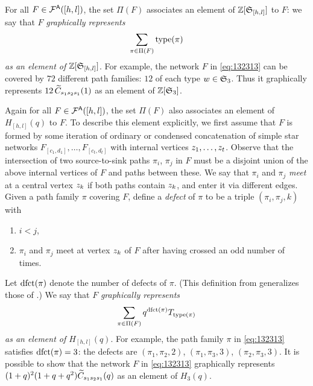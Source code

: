 \documentclass[11pt]{article}
\theoremstyle{definition}
\numberwithin{equation}{section}
\begin{document}
For all $F \in \mathcal F^{\mathsf{A}}([h,l])$, the set $\Pi(F)$ associates an element of
$\mathbb Z[\mathfrak{S}_{[h,l]}]$ to $F$:
we say that $F$ {\em graphically represents}
\begin{equation}\label{eq:Gtozsn}
\sum_{\pi \in \Pi(F)} \type(\pi)
\end{equation}
{\em as an element of $\mathbb Z[\mathfrak{S}_{[h,l]}]$}.
For example, the network $F$ in \eqref{eq:132313} can be covered by
$72$ different path families: $12$ of each type $w \in \mathfrak{S}_{3}$.
Thus it graphically represents
$12\,\widetilde{C}_{s_1s_2s_1}(1)$
as an element of $\mathbb Z [\mathfrak{S}_{3}]$.

Again for all $F \in \mathcal F^{\mathsf{A}}([h,l])$,
the set $\Pi(F)$ also associates an element of
$H_{[h,l]}(q)$ to $F$.
To describe this element explicitly, we first assume
that $F$ is formed by some iteration of ordinary or condensed concatenation
of simple star networks $F_{[c_1,d_1]}, \dotsc, F_{[c_t,d_t]}$ with
internal vertices $z_1, \dotsc, z_t$. Observe that
the intersection of two source-to-sink paths $\pi_i$, $\pi_j$ in $F$
must be a disjoint union of the above internal vertices of $F$
and paths between these.
We say that $\pi_i$ and $\pi_j$ {\em meet} at a central vertex $z_k$
if both paths contain $z_k$, and enter it via different edges.
Given a path family $\pi$ covering $F$,
define a {\em defect} of $\pi$ to be a triple $(\pi_i, \pi_j, k)$ with
\begin{enumerate}
  \item $i < j$,
  \item $\pi_i$ and $\pi_j$ meet at vertex $z_k$ of
    $F$ after having crossed an odd number of times.
\end{enumerate}
Let $\mathrm{dfct}(\pi)$ denote the number of defects of $\pi$.
(This definition from \cite{CSkanTNNChar}
generalizes those of \cite{BWHex, Deodhar90}.)
We say that $F$ {\em graphically represents}
\begin{equation}\label{eq:Gtozhnq}
\sum_{\pi \in \Pi(F)} q^{\dfct(\pi)} T_{\type(\pi)}
\end{equation}
{\em as an element of $H_{[h,l]}(q)$}.
For example,
the path family $\pi$ in \eqref{eq:132313}
satisfies $\mathrm{dfct}(\pi) = 3$: the defects are
$(\pi_1, \pi_2, 2)$, $(\pi_1, \pi_3, 3)$, $(\pi_2, \pi_3, 3)$.
It is possible to show that the network $F$ in \eqref{eq:132313}
graphically represents
$(1+q)^2(1+q+q^2) \widetilde{C}_{s_1s_2s_1}(q)$
as an element of $H_3(q)$.
\end{document}
